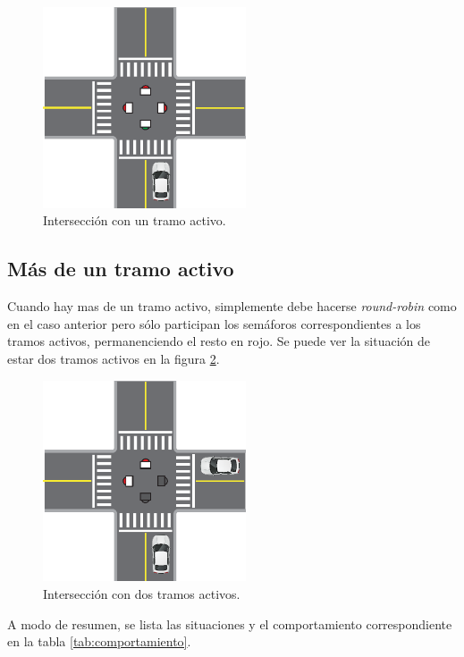 	\begin{figure}[htbp]
		\centering
		\includegraphics[width=6cm]{imagenes/un-activo.eps}
		\caption{Intersección con un tramo activo.}
		\label{fig:un-activo}
	\end{figure}



\subsection{Más de un tramo activo}

	Cuando hay mas de un tramo activo, simplemente debe hacerse \emph{round-robin} como en el caso anterior pero sólo participan los semáforos correspondientes a los tramos activos, permanenciendo el resto en rojo.
	Se puede ver la situación de estar dos tramos activos en la figura \ref{fig:dos-activos}.

	\begin{figure}[htbp]
		\centering
		\includegraphics[width=6cm]{imagenes/dos-activos.eps}
		\caption{Intersección con dos tramos activos.}
		\label{fig:dos-activos}
	\end{figure}

	A modo de resumen, se lista las situaciones y el comportamiento correspondiente en la tabla \ref{tab:comportamiento}.

